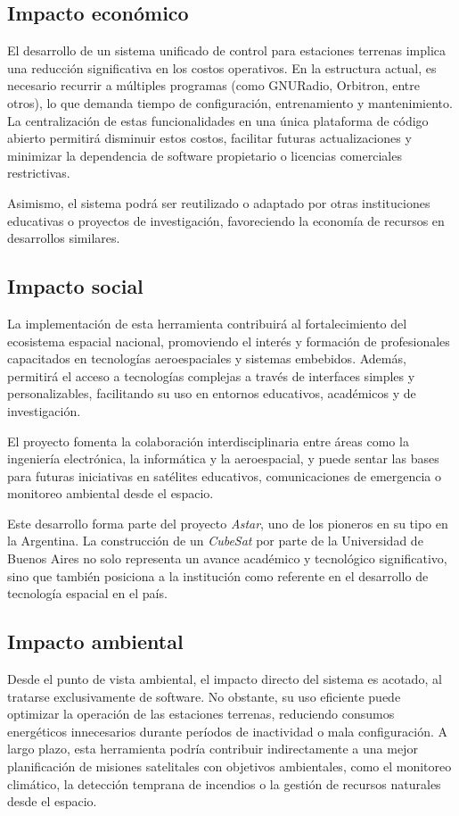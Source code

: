 \subsection*{Impacto económico}

El desarrollo de un sistema unificado de control para estaciones terrenas implica una reducción significativa en los costos operativos. En la estructura actual, es necesario recurrir a múltiples programas (como GNURadio, Orbitron, entre otros), lo que demanda tiempo de configuración, entrenamiento y mantenimiento. La centralización de estas funcionalidades en una única plataforma de código abierto permitirá disminuir estos costos, facilitar futuras actualizaciones y minimizar la dependencia de software propietario o licencias comerciales restrictivas.

Asimismo, el sistema podrá ser reutilizado o adaptado por otras instituciones educativas o proyectos de investigación, favoreciendo la economía de recursos en desarrollos similares.

\subsection*{Impacto social}

La implementación de esta herramienta contribuirá al fortalecimiento del ecosistema espacial nacional, promoviendo el interés y formación de profesionales capacitados en tecnologías aeroespaciales y sistemas embebidos. Además, permitirá el acceso a tecnologías complejas a través de interfaces simples y personalizables, facilitando su uso en entornos educativos, académicos y de investigación.

El proyecto fomenta la colaboración interdisciplinaria entre áreas como la ingeniería electrónica, la informática y la aeroespacial, y puede sentar las bases para futuras iniciativas en satélites educativos, comunicaciones de emergencia o monitoreo ambiental desde el espacio.

Este desarrollo forma parte del proyecto \textit{Astar}, uno de los pioneros en su tipo en la Argentina. La construcción de un \textit{CubeSat} por parte de la Universidad de Buenos Aires no solo representa un avance académico y tecnológico significativo, sino que también posiciona a la institución como referente en el desarrollo de tecnología espacial en el país.

\subsection*{Impacto ambiental}

Desde el punto de vista ambiental, el impacto directo del sistema es acotado, al tratarse exclusivamente de software. No obstante, su uso eficiente puede optimizar la operación de las estaciones terrenas, reduciendo consumos energéticos innecesarios durante períodos de inactividad o mala configuración. A largo plazo, esta herramienta podría contribuir indirectamente a una mejor planificación de misiones satelitales con objetivos ambientales, como el monitoreo climático, la detección temprana de incendios o la gestión de recursos naturales desde el espacio.
